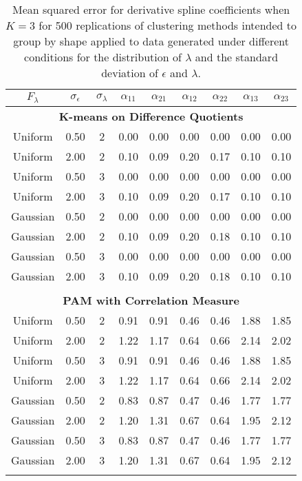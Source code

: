 \begin{table}[ht]
\begin{center}
\begin{tabular}{ccc|cccccc}
  \thickhline $F_{\lambda}$&$\sigma_{\epsilon}$&$\sigma_{\lambda}$&$\alpha_{11}$&$\alpha_{21}$&$\alpha_{12}$&$\alpha_{22}$&$\alpha_{13}$&$\alpha_{23}$\\  \hline\multicolumn{9}{c}{\textbf{K-means on Difference Quotients}}\\ Uniform & 0.50 &   2 & 0.00 & 0.00 & 0.00 & 0.00 & 0.00 & 0.00 \\ 
  Uniform & 2.00 &   2 & 0.10 & 0.09 & 0.20 & 0.17 & 0.10 & 0.10 \\ 
  Uniform & 0.50 &   3 & 0.00 & 0.00 & 0.00 & 0.00 & 0.00 & 0.00 \\ 
  Uniform & 2.00 &   3 & 0.10 & 0.09 & 0.20 & 0.17 & 0.10 & 0.10 \\ 
  Gaussian & 0.50 &   2 & 0.00 & 0.00 & 0.00 & 0.00 & 0.00 & 0.00 \\ 
  Gaussian & 2.00 &   2 & 0.10 & 0.09 & 0.20 & 0.18 & 0.10 & 0.10 \\ 
  Gaussian & 0.50 &   3 & 0.00 & 0.00 & 0.00 & 0.00 & 0.00 & 0.00 \\ 
  Gaussian & 2.00 &   3 & 0.10 & 0.09 & 0.20 & 0.18 & 0.10 & 0.10 \\ 
   \\ \multicolumn{9}{c}{\textbf{PAM with Correlation Measure}}\\Uniform & 0.50 &   2 & 0.91 & 0.91 & 0.46 & 0.46 & 1.88 & 1.85 \\ 
  Uniform & 2.00 &   2 & 1.22 & 1.17 & 0.64 & 0.66 & 2.14 & 2.02 \\ 
  Uniform & 0.50 &   3 & 0.91 & 0.91 & 0.46 & 0.46 & 1.88 & 1.85 \\ 
  Uniform & 2.00 &   3 & 1.22 & 1.17 & 0.64 & 0.66 & 2.14 & 2.02 \\ 
  Gaussian & 0.50 &   2 & 0.83 & 0.87 & 0.47 & 0.46 & 1.77 & 1.77 \\ 
  Gaussian & 2.00 &   2 & 1.20 & 1.31 & 0.67 & 0.64 & 1.95 & 2.12 \\ 
  Gaussian & 0.50 &   3 & 0.83 & 0.87 & 0.47 & 0.46 & 1.77 & 1.77 \\ 
  Gaussian & 2.00 &   3 & 1.20 & 1.31 & 0.67 & 0.64 & 1.95 & 2.12 \\ 
   \thickhline\end{tabular}
\caption{Mean squared error for derivative spline coefficients when $K=3$ for 500 replications of clustering methods intended to group by shape applied to data generated under different conditions for the distribution of $\lambda$ and the standard deviation of $\epsilon$ and $\lambda$.}
\label{tab:mse2}
\end{center}
\end{table}
